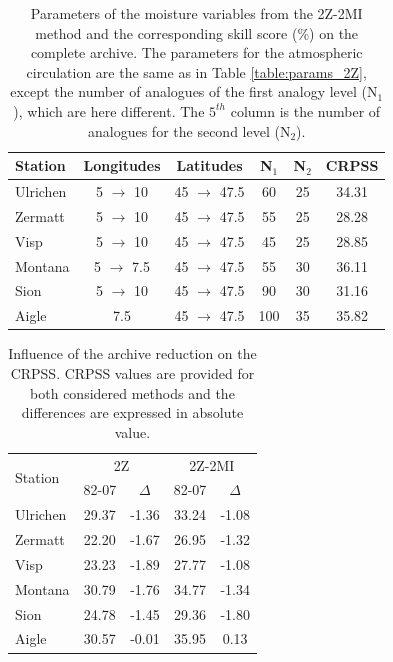 \documentclass[hess]{copernicus}
\begin{document}
\begin{table}[htb]
	\caption{Parameters of the moisture variables from the 2Z-2MI method and the corresponding skill score (\%) on the complete archive. The parameters for the atmospheric circulation are the same as in Table \ref{table:params_2Z}, except the number of analogues of the first analogy level (N$_{1}$), which are here different. The $5^{th}$ column is the number of analogues for the second level (N$_{2}$).}
	\begin{center}
		\begin{tabular}{l c c c c c }
			\hline
			Station & Longitudes & Latitudes & N$_{1}$ & N$_{2}$ & CRPSS \\
			\hline
			Ulrichen & 5 $\rightarrow$ 10 & 45 $\rightarrow$ 47.5 & 60 & 25 & 34.31 \\
			Zermatt & 5 $\rightarrow$ 10 & 45 $\rightarrow$ 47.5 & 55 & 25 & 28.28 \\
			Visp & 5 $\rightarrow$ 10 & 45 $\rightarrow$ 47.5 & 45 & 25 & 28.85 \\
			Montana & 5 $\rightarrow$ 7.5 & 45 $\rightarrow$ 47.5 & 55 & 30 & 36.11 \\
			Sion & 5 $\rightarrow$ 10 & 45 $\rightarrow$ 47.5 & 90 & 30 & 31.16 \\
			Aigle & 7.5 & 45 $\rightarrow$ 47.5 & 100 & 35 & 35.82 \\ 
			\hline
		\end{tabular}
	\end{center}
	\label{table:params_2Z-2MI}
\end{table}

\begin{table}[htb]
	\caption{Influence of the archive reduction on the CRPSS. CRPSS values are provided for both considered methods and the differences are expressed in absolute value.}
	\begin{center}
		\begin{tabular}{l c c c c }
			\hline
			\multirow{2}{*}{Station} & \multicolumn{2}{c}{2Z} & \multicolumn{2}{c}{2Z-2MI} \\
			& 82-07 & $\Delta$ & 82-07 & $\Delta$ \\ 
			\hline
			Ulrichen & 29.37 & -1.36 & 33.24 & -1.08 \\
			Zermatt & 22.20 & -1.67 & 26.95 & -1.32 \\
			Visp & 23.23 & -1.89 & 27.77 & -1.08 \\
			Montana & 30.79 & -1.76 & 34.77 & -1.34 \\
			Sion & 24.78 & -1.45 & 29.36 & -1.80 \\
			Aigle & 30.57 & -0.01 & 35.95 & 0.13 \\ 
			\hline
		\end{tabular}
	\end{center}
	\label{table:loss_reduction}
\end{table}
\end{document}
